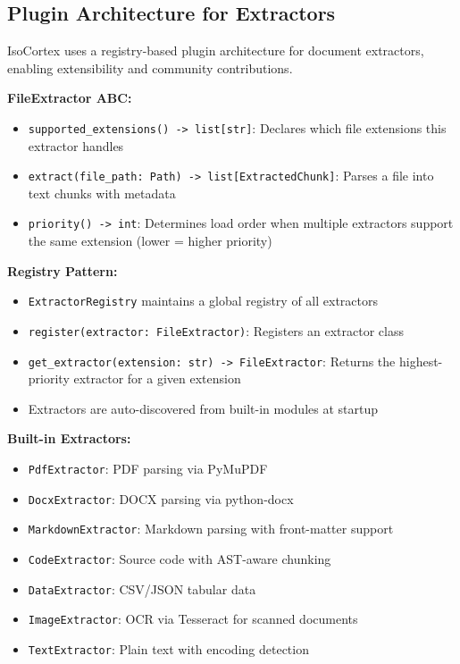 \documentclass[11pt,a4paper]{article}
\newcommand{\inlinecode}[1]{\texttt{\small\colorbox{ctCodeBg}{#1}}}
\begin{document}
\subsection{Plugin Architecture for Extractors}

\begin{reqbox}
IsoCortex uses a registry-based plugin architecture for document extractors, enabling extensibility and community contributions.

\textbf{FileExtractor ABC:}
\begin{itemize}
    \item \inlinecode{supported\_extensions() -> list[str]}: Declares which file extensions this extractor handles
    \item \inlinecode{extract(file\_path: Path) -> list[ExtractedChunk]}: Parses a file into text chunks with metadata
    \item \inlinecode{priority() -> int}: Determines load order when multiple extractors support the same extension (lower = higher priority)
\end{itemize}

\textbf{Registry Pattern:}
\begin{itemize}
    \item \inlinecode{ExtractorRegistry} maintains a global registry of all extractors
    \item \inlinecode{register(extractor: FileExtractor)}: Registers an extractor class
    \item \inlinecode{get\_extractor(extension: str) -> FileExtractor}: Returns the highest-priority extractor for a given extension
    \item Extractors are auto-discovered from built-in modules at startup
\end{itemize}

\textbf{Built-in Extractors:}
\begin{itemize}
    \item \inlinecode{PdfExtractor}: PDF parsing via PyMuPDF
    \item \inlinecode{DocxExtractor}: DOCX parsing via python-docx
    \item \inlinecode{MarkdownExtractor}: Markdown parsing with front-matter support
    \item \inlinecode{CodeExtractor}: Source code with AST-aware chunking
    \item \inlinecode{DataExtractor}: CSV/JSON tabular data
    \item \inlinecode{ImageExtractor}: OCR via Tesseract for scanned documents
    \item \inlinecode{TextExtractor}: Plain text with encoding detection
\end{itemize}


\end{reqbox}
\end{document}
